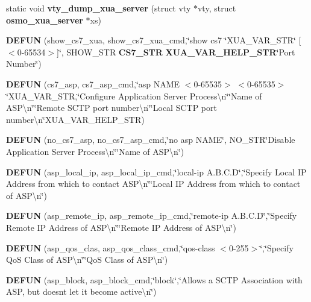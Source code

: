 \begin{DoxyCompactItemize}
\item 
static void {\bf vty\+\_\+dump\+\_\+xua\+\_\+server} (struct vty $\ast$vty, struct {\bf osmo\+\_\+xua\+\_\+server} $\ast$xs)
\item 
{\bf D\+E\+F\+UN} (show\+\_\+cs7\+\_\+xua, show\+\_\+cs7\+\_\+xua\+\_\+cmd,\char`\"{}show cs7 \char`\"{}X\+U\+A\+\_\+\+V\+A\+R\+\_\+\+S\+TR\char`\"{} [$<$0-\/65534$>$]\char`\"{}, S\+H\+O\+W\+\_\+\+S\+TR {\bf C\+S7\+\_\+\+S\+TR} {\bf X\+U\+A\+\_\+\+V\+A\+R\+\_\+\+H\+E\+L\+P\+\_\+\+S\+TR}\char`\"{}Port Number\char`\"{})
\item 
{\bf D\+E\+F\+UN} (cs7\+\_\+asp, cs7\+\_\+asp\+\_\+cmd,\char`\"{}asp N\+A\+ME $<$0-\/65535$>$ $<$0-\/65535$>$ \char`\"{}X\+U\+A\+\_\+\+V\+A\+R\+\_\+\+S\+TR,\char`\"{}Configure Application Server Process\textbackslash{}n\char`\"{}\char`\"{}Name of A\+S\+P\textbackslash{}n\char`\"{}\char`\"{}Remote S\+C\+TP port number\textbackslash{}n\char`\"{}\char`\"{}Local S\+C\+TP port number\textbackslash{}n\char`\"{}X\+U\+A\+\_\+\+V\+A\+R\+\_\+\+H\+E\+L\+P\+\_\+\+S\+TR)
\item 
{\bf D\+E\+F\+UN} (no\+\_\+cs7\+\_\+asp, no\+\_\+cs7\+\_\+asp\+\_\+cmd,\char`\"{}no asp N\+A\+ME\char`\"{}, N\+O\+\_\+\+S\+TR\char`\"{}Disable Application Server Process\textbackslash{}n\char`\"{}\char`\"{}Name of A\+S\+P\textbackslash{}n\char`\"{})
\item 
{\bf D\+E\+F\+UN} (asp\+\_\+local\+\_\+ip, asp\+\_\+local\+\_\+ip\+\_\+cmd,\char`\"{}local-\/ip A.\+B.\+C.\+D\char`\"{},\char`\"{}Specify Local IP Address from which to contact A\+S\+P\textbackslash{}n\char`\"{}\char`\"{}Local IP Address from which to contact of A\+S\+P\textbackslash{}n\char`\"{})
\item 
{\bf D\+E\+F\+UN} (asp\+\_\+remote\+\_\+ip, asp\+\_\+remote\+\_\+ip\+\_\+cmd,\char`\"{}remote-\/ip A.\+B.\+C.\+D\char`\"{},\char`\"{}Specify Remote IP Address of A\+S\+P\textbackslash{}n\char`\"{}\char`\"{}Remote IP Address of A\+S\+P\textbackslash{}n\char`\"{})
\item 
{\bf D\+E\+F\+UN} (asp\+\_\+qos\+\_\+clas, asp\+\_\+qos\+\_\+class\+\_\+cmd,\char`\"{}qos-\/class $<$0-\/255$>$\char`\"{},\char`\"{}Specify QoS Class of A\+S\+P\textbackslash{}n\char`\"{}\char`\"{}QoS Class of A\+S\+P\textbackslash{}n\char`\"{})
\item 
{\bf D\+E\+F\+UN} (asp\+\_\+block, asp\+\_\+block\+\_\+cmd,\char`\"{}block\char`\"{},\char`\"{}Allows a S\+C\+TP Association with A\+SP, but doesn\textquotesingle{}t let it become active\textbackslash{}n\char`\"{})
\item 

\end{DoxyCompactItemize}
